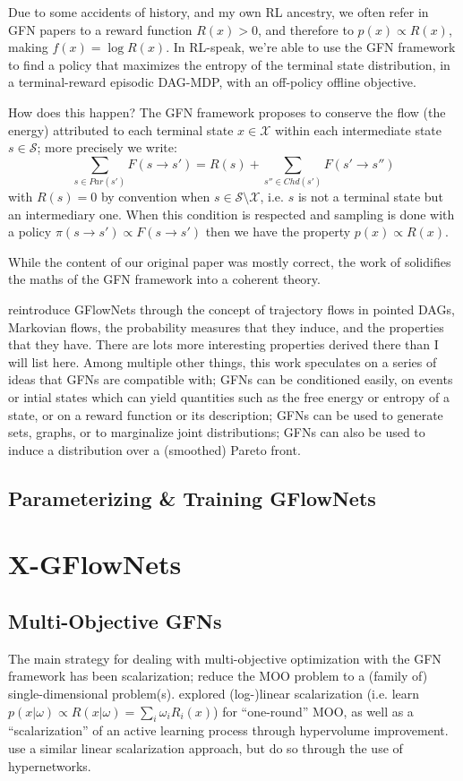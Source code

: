 Due to some accidents of history, and my own RL ancestry, we often refer in GFN papers to a reward function $R(x)>0$, and therefore to $p(x)\propto R(x)$, making $f(x) = \log R(x)$. In RL-speak, we're able to use the GFN framework to find a policy that maximizes the entropy of the terminal state distribution, in a terminal-reward episodic DAG-MDP, with an off-policy offline objective.

How does this happen? The GFN framework proposes to conserve the flow (the energy) attributed to each terminal state $x\in\mathcal{X}$ within each intermediate state $s\in\mathcal{S}$; more precisely we write:
$$\sum_{s\in Par(s')} F(s\to s') = R(s) + \sum_{s''\in Chd(s')} F(s'\to s'')$$
with $R(s)=0$ by convention when $s\in \mathcal{S}\setminus \mathcal{X}$, i.e. $s$ is not a terminal state but an intermediary one. When this condition is respected and sampling is done with a policy $\pi(s\to s')\propto F(s\to s')$ then we have the property $p(x)\propto R(x)$. 

While the content of our original paper \cite{bengio2021flow} was mostly correct, the work of \citet{bengio2021gflownet} solidifies the maths of the GFN framework into a coherent theory.

\citet{bengio2021gflownet} reintroduce GFlowNets through the concept of trajectory flows in pointed DAGs, Markovian flows, the probability measures that they induce, and the properties that they have. There are lots more interesting properties derived there than I will list here. Among multiple other things, this work speculates on a series of ideas that GFNs are compatible with; GFNs can be conditioned easily, on events or intial states which can yield quantities such as the free energy or entropy of a state, or on a reward function or its description; GFNs can be used to generate sets, graphs, or to marginalize joint distributions; GFNs can also be used to induce a distribution over a (smoothed) Pareto front.

\subsection{Parameterizing & Training GFlowNets}

\section{X-GFlowNets}

\subsection{Multi-Objective GFNs}
The main strategy for dealing with multi-objective optimization with the GFN framework has been scalarization; reduce the MOO problem to a (family of) single-dimensional problem(s). \citet{jain2023multi} explored (log-)linear scalarization (i.e. learn $p(x|\omega)\propto R(x|\omega) = \sum_i \omega_i R_i(x)$) for ``one-round'' MOO, as well as a ``scalarization'' of an active learning process through hypervolume improvement. \citet{zhu2023sample} use a similar linear scalarization approach, but do so through the use of hypernetworks.


